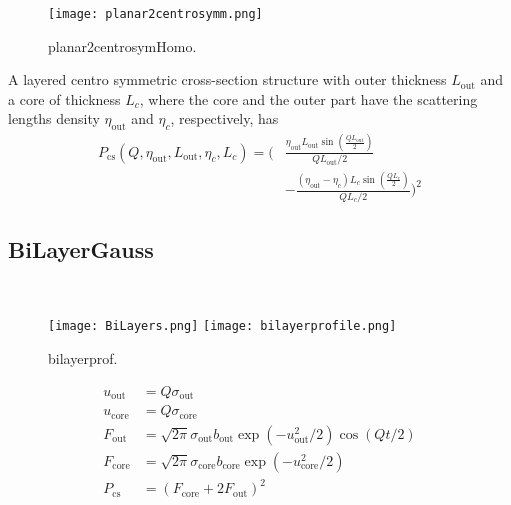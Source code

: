 \begin{figure}[htb]
\begin{center}
\texttt{[image: planar2centrosymm.png]}
\end{center}
\caption{planar2centrosymHomo.}
\label{fig:planar2centrosymm}
\end{figure}
A layered centro symmetric cross-section structure with outer
thickness $L_\text{out}$ and a core of thickness $L_c$, where the
core and the outer part have the scattering lengths density
$\eta_\text{out}$ and $\eta_c$, respectively, has
\begin{align}
P_\text{cs}(Q,\eta_\text{out},L_\text{out},\eta_c,L_c)
= \Biggl( & \frac{\eta_\text{out}L_\text{out}\sin\left(\frac{QL_\text{out}}{2}\right)}{QL_\text{out}/2} \\
&-  \frac{(\eta_\text{out}-\eta_c)L_c\sin\left(\frac{QL_c}{2}\right)}{QL_c/2}\Biggr)^2 \nonumber
\end{align}


\clearpage
\subsection{BiLayerGauss \cite{Pabst2000}}
\label{sect:BiLayerGauss}
~\\
\begin{figure}[htb]
\begin{center}
\texttt{[image: BiLayers.png]}
\texttt{[image: bilayerprofile.png]}
\end{center}
\caption{bilayerprof.}
\label{fig:bilayerprof}
\end{figure}

\begin{align}
   u_\text{out}  &= Q\sigma_\text{out} \\
   u_\text{core} &= Q\sigma_\text{core} \\
   F_\text{out}  &= \sqrt{2\pi}\sigma_\text{out}  b_\text{out}  \exp(-u_\text{out}^2/2) \cos(Qt/2) \\
   F_\text{core} &= \sqrt{2\pi}\sigma_\text{core} b_\text{core} \exp(-u_\text{core}^2/2)  \\
   P_\text{cs}   &=(F_\text{core}+2 F_\text{out})^2
\end{align}
